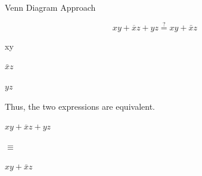 \documentclass[12pt,openany, tikz,border=10pt]{book}
\begin{document}
			      	Venn Diagram Approach
			      	
			      	\[
			      		xy + \overline{x}z + yz \stackrel{?}{=} xy + \bar{x}z
			      	\]
			      	
			      	
			      	\noindent %
			      	\begin{minipage}{.33\textwidth}
			      		\centering %
			      		\begin{venndiagram3sets}[labelA=\(x\), labelB=\(y\), labelC=\(z\)]
			      			\fillACapB
			      		\end{venndiagram3sets}
			      		xy %
			      	\end{minipage}%
			      	\begin{minipage}{.33\textwidth}
			      		\centering
			      		\begin{venndiagram3sets}[labelA=\(x\), labelB=\(y\), labelC=\(z\)]
			      			\fillCNotA
			      		\end{venndiagram3sets}
			      		$\bar{x}z$
			      	\end{minipage}%
			      	\begin{minipage}{.33\textwidth}
			      		\centering
			      		\begin{venndiagram3sets}[labelA=\(x\), labelB=\(y\), labelC=\(z\)]
			      			\fillBCapC
			      		\end{venndiagram3sets}
			      		$yz$
			      	\end{minipage}
			      	
			      	\vspace{10px}
			      	Thus, the two expressions are equivalent. \newline \vspace*{20px}
			      	\noindent %
			      	\begin{minipage}[c]{0.30\textwidth} %
			      		\centering %
			      		\begin{venndiagram3sets}[labelA=\(x\), labelB=\(y\), labelC=\(z\)]
			      			\fillACapB
			      			\fillOnlyC
			      			\fillBCapC
			      		\end{venndiagram3sets}
			      		$ xy + \overline{x}z + yz $
			      	\end{minipage}%
			      	\hfill %
			      	{\large $\equiv$} %
			      	\hfill %
			      	\begin{minipage}[c]{0.45\textwidth} %
			      		\centering %
			      		\begin{venndiagram3sets}[labelA=\(x\), labelB=\(y\), labelC=\(z\)]
			      			\fillACapB
			      			\fillOnlyC
			      			\fillBCapC
			      		\end{venndiagram3sets}
			      		$ xy + \bar{x}z$
			      	\end{minipage}
			      	\hspace*{100px}
			      	
\end{document}
